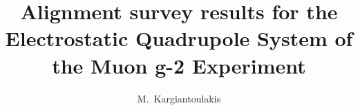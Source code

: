 \title{Alignment survey results for the Electrostatic Quadrupole System of the Muon g-2 Experiment}


\author[1]{M.~Kargiantoulakis}

\begin{comment}
\author[1]{Manolis Kargiantoulakis}
\affil[1]{%
Fermilab National Laboratory, ekargian@fnal.gov
}%

\end{comment}
